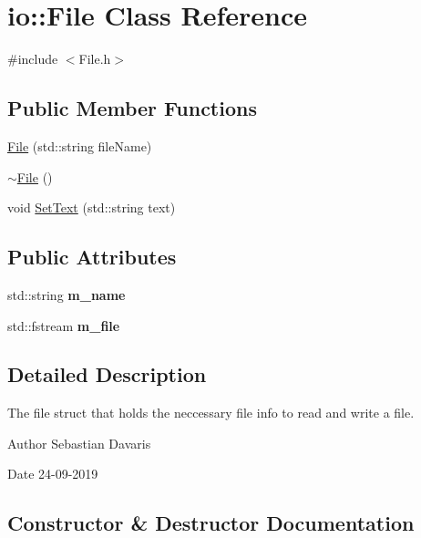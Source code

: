 \hypertarget{classio_1_1_file}{}\section{io\+:\+:File Class Reference}
\label{classio_1_1_file}


{\ttfamily \#include $<$File.\+h$>$}

\subsection*{Public Member Functions}
\begin{DoxyCompactItemize}
\item 
\hyperlink{classio_1_1_file_ad3651efb6463c3384fc43ca8992472ce}{File} (std\+::string file\+Name)
\item 
\hyperlink{classio_1_1_file_af1c861a626e238b71e1074ab27a666b6}{$\sim$\+File} ()
\item 
void \hyperlink{classio_1_1_file_ab8996ee8da7ddf32e7e872f3e2f39ac9}{Set\+Text} (std\+::string text)
\end{DoxyCompactItemize}
\subsection*{Public Attributes}
\begin{DoxyCompactItemize}
\item 
\mbox{\label{classio_1_1_file_a1b9a809bd2244c7a2c31ffd7ba317815}} 
std\+::string {\bfseries m\+\_\+name}
\item 
\mbox{\label{classio_1_1_file_ac56f20498a5831a312e4a5e9d43be7d7}} 
std\+::fstream {\bfseries m\+\_\+file}
\end{DoxyCompactItemize}


\subsection{Detailed Description}
The file struct that holds the neccessary file info to read and write a file. \begin{DoxyAuthor}{Author}
Sebastian Davaris 
\end{DoxyAuthor}
\begin{DoxyDate}{Date}
24-\/09-\/2019 
\end{DoxyDate}


\subsection{Constructor \& Destructor Documentation}
\mbox{\label{classio_1_1_file_ad3651efb6463c3384fc43ca8992472ce}} 
